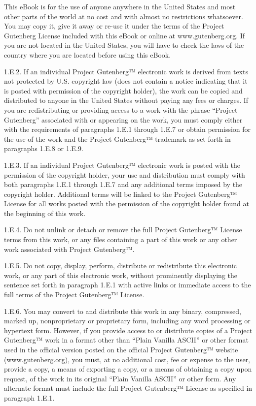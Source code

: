     This eBook is for the use of anyone anywhere in the United States and most
    other parts of the world at no cost and with almost no restrictions
    whatsoever. You may copy it, give it away or re-use it under the terms
    of the Project Gutenberg License included with this eBook or online
    at www.gutenberg.org. If you
    are not located in the United States, you will have to check the laws
    of the country where you are located before using this eBook.

1.E.2. If an individual Project Gutenberg™ electronic work is
derived from texts not protected by U.S. copyright law (does not
contain a notice indicating that it is posted with permission of the
copyright holder), the work can be copied and distributed to anyone in
the United States without paying any fees or charges. If you are
redistributing or providing access to a work with the phrase “Project
Gutenberg” associated with or appearing on the work, you must comply
either with the requirements of paragraphs 1.E.1 through 1.E.7 or
obtain permission for the use of the work and the Project Gutenberg™
trademark as set forth in paragraphs 1.E.8 or 1.E.9.

1.E.3. If an individual Project Gutenberg™ electronic work is posted
with the permission of the copyright holder, your use and distribution
must comply with both paragraphs 1.E.1 through 1.E.7 and any
additional terms imposed by the copyright holder. Additional terms
will be linked to the Project Gutenberg™ License for all works
posted with the permission of the copyright holder found at the
beginning of this work.

1.E.4. Do not unlink or detach or remove the full Project Gutenberg™
License terms from this work, or any files containing a part of this
work or any other work associated with Project Gutenberg™.

1.E.5. Do not copy, display, perform, distribute or redistribute this
electronic work, or any part of this electronic work, without
prominently displaying the sentence set forth in paragraph 1.E.1 with
active links or immediate access to the full terms of the Project
Gutenberg™ License.

1.E.6. You may convert to and distribute this work in any binary,
compressed, marked up, nonproprietary or proprietary form, including
any word processing or hypertext form. However, if you provide access
to or distribute copies of a Project Gutenberg™ work in a format
other than “Plain Vanilla ASCII” or other format used in the official
version posted on the official Project Gutenberg™ website
(www.gutenberg.org), you must, at no additional cost, fee or expense
to the user, provide a copy, a means of exporting a copy, or a means
of obtaining a copy upon request, of the work in its original “Plain
Vanilla ASCII” or other form. Any alternate format must include the
full Project Gutenberg™ License as specified in paragraph 1.E.1.

